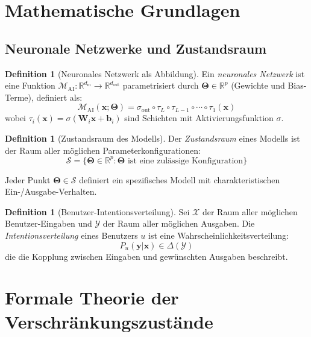 \documentclass[12pt, a4paper]{article}
\theoremstyle{definition}
\newtheorem{definition}[theorem]{Definition}
\theoremstyle{remark}
\newcommand{\R}{\mathbb{R}}
\newcommand{\vx}{\bm{x}}
\newcommand{\vy}{\bm{y}}
\newcommand{\vW}{\bm{W}}
\newcommand{\vTheta}{\bm{\Theta}}
\newcommand{\Model}{\mathcal{M}_{\mathrm{AI}}}
\begin{document}
\section{Mathematische Grundlagen}
\label{sec:grundlagen}

\subsection{Neuronale Netzwerke und Zustandsraum}
\label{subsec:neural_state}

\begin{definition}[Neuronales Netzwerk als Abbildung]
\label{def:neural_net}
Ein \emph{neuronales Netzwerk} ist eine Funktion $\Model: \R^{d_{\mathrm{in}}} \to \R^{d_{\mathrm{out}}}$ parametrisiert durch $\vTheta \in \R^p$ (Gewichte und Bias-Terme), definiert als:
\[
  \Model(\vx; \vTheta) = \sigma_{\mathrm{out}} \circ \tau_L \circ \tau_{L-1} \circ \cdots \circ \tau_1(\vx)
\]
wobei $\tau_i(\vx) = \sigma(\vW_i \vx + \mathbf{b}_i)$ sind Schichten mit Aktivierungsfunktion $\sigma$.
\end{definition}

\begin{definition}[Zustandsraum des Modells]
\label{def:state_space}
Der \emph{Zustandsraum} eines Modells ist der Raum aller möglichen Parameterkonfigurationen:
\[
  \mathcal{S} = \{\vTheta \in \R^p : \vTheta \text{ ist eine zulässige Konfiguration}\}
\]

Jeder Punkt $\vTheta \in \mathcal{S}$ definiert ein spezifisches Modell mit charakteristischen Ein-/Ausgabe-Verhalten.
\end{definition}

\begin{definition}[Benutzer-Intentionsverteilung]
\label{def:user_intent}
Sei $\mathcal{X}$ der Raum aller möglichen Benutzer-Eingaben und $\mathcal{Y}$ der Raum aller möglichen Ausgaben. Die \emph{Intentionsverteilung} eines Benutzers $u$ ist eine Wahrscheinlichkeitsverteilung:
\[
  P_u(\vy | \vx) \in \Delta(\mathcal{Y})
\]
die die Kopplung zwischen Eingaben und gewünschten Ausgaben beschreibt.
\end{definition}

\section{Formale Theorie der Verschränkungszustände}
\label{sec:verschränkung}
\end{document}
